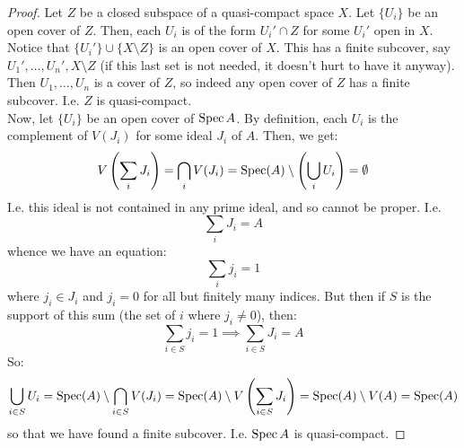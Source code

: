 \begin{proof}
	Let $Z$ be a closed subspace of a quasi-compact space $X$. Let $\{U_i\}$ be an open cover of $Z$. Then, each $U_i$ is of the form $U_i' \cap Z$ for some $U_i'$ open in $X$. Notice that $\{U_i'\} \cup \{ X \setminus Z \}$ is an open cover of $X$. This has a finite subcover, say $U_1',\ldots,U_n',X \setminus Z$ (if this last set is not needed, it doesn't hurt to have it anyway). Then $U_1,\ldots,U_n$ is a cover of $Z$, so indeed any open cover of $Z$ has a finite subcover. I.e. $Z$ is quasi-compact. \\
	
	Now, let $\{U_i\}$ be an open cover of $\operatorname{Spec} A$. By definition, each $U_i$ is the complement of $V(J_i)$ for some ideal $J_i$ of $A$. Then, we get:
	\[ V\left(\sum_i J_i\right) = \bigcap_i V(J_i) = \operatorname{Spec}(A) \setminus \left(\bigcup_i U_i\right) = \emptyset \]
	I.e. this ideal is not contained in any prime ideal, and so cannot be proper. I.e.
	\[ \sum_i J_i = A \]
	whence we have an equation:
	\[ \sum_i j_i = 1 \]
	where $j_i \in J_i$ and $j_i = 0$ for all but finitely many indices. But then if $S$ is the support of this sum (the set of $i$ where $j_i \neq 0$), then:
	\[ \sum_{i \in S} j_i = 1 \implies \sum_{i \in S} J_i = A \]
	So:
	\[ \bigcup_{i \in S} U_i = \operatorname{Spec}(A) \setminus \bigcap_{i \in S} V(J_i) = \operatorname{Spec}(A) \setminus V\left(\sum_{i \in S} J_i\right) = \operatorname{Spec}(A) \setminus V(A) = \operatorname{Spec}(A) \]
	so that we have found a finite subcover. I.e. $\operatorname{Spec} A$ is quasi-compact.
\end{proof}
